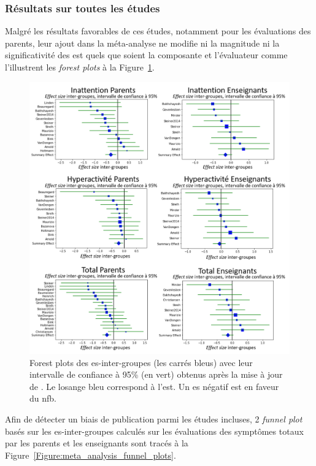 \subsubsection{Résultats sur toutes les études}

Malgré les résultats favorables de ces études, notamment pour les évaluations des parents, leur ajout dans la méta-analyse ne modifie ni la magnitude
ni la significativité des \gls{est} quels que soient la composante et l'évaluateur comme l'illustrent les \textit{forest plots} à 
la Figure~\ref{Figure:meta_analysis_forest_plots}.

\begin{figure}[h!]
  \centering
	\includegraphics[width=1\linewidth]{figures/chapter-2/meta-analysis-forest-plots} 
  \caption{Forest plots des \gls{es}-inter-groupes (les carrés bleus) avec leur intervalle de confiance à 95\% (en vert) obtenus après la mise à jour de 
	\citet{Cortese2016}. Le losange bleu correspond à l'\gls{est}.
	Un \gls{es} négatif est en faveur du \gls{nfb}.}
  \label{Figure:meta_analysis_forest_plots}
\end{figure}

Afin de détecter un biais de publication parmi les études incluses, 2 \textit{funnel plot} basés sur les \gls{es}-inter-groupes calculés sur les évaluations
des symptômes totaux par les parents et les enseignants sont tracés à la Figure~\ref{Figure:meta_analysis_funnel_plots}. 

